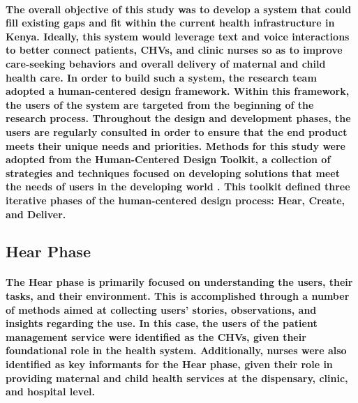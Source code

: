 \paragraph{The overall objective of this study was to develop a system that could fill existing gaps and fit within the current health infrastructure in Kenya. Ideally, this system would leverage text and voice interactions to better connect patients, CHVs, and clinic nurses so as to improve care-seeking behaviors and overall delivery of maternal and child health care. In order to build such a system, the research team adopted a human-centered design framework. Within this framework, the users of the system are targeted from the beginning of the research process. Throughout the design and development phases, the users are regularly consulted in order to ensure that the end product meets their unique needs and priorities. Methods for this study were adopted from the Human-Centered Design Toolkit, a collection of strategies and techniques focused on developing solutions that meet the needs of users in the developing world \citep{HCDToolkit}. This toolkit defined three iterative phases of the human-centered design process: Hear, Create, and Deliver. }

\subsection{Hear Phase}
\paragraph{The Hear phase is primarily focused on understanding the users, their tasks, and their environment. This is accomplished through a number of methods aimed at collecting users' stories, observations, and insights regarding the use. In this case, the users of the patient management service were identified as the CHVs, given their foundational role in the health system. Additionally, nurses were also identified as key informants for the Hear phase, given their role in providing maternal and child health services at the dispensary, clinic, and hospital level.}

